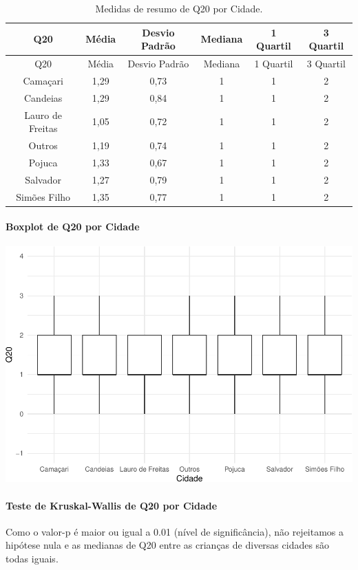 \documentclass[]{article}
\let\oldparagraph\paragraph
\renewcommand{\paragraph}[1]{\oldparagraph{#1}\mbox{}}
\begin{document}
\begin{longtable}[]{@{}cccccc@{}}
\caption{\label{tab:unnamed-chunk-371}Medidas de resumo de Q20 por Cidade.}\tabularnewline
\toprule
Q20 & Média & Desvio Padrão & Mediana & 1 Quartil & 3 Quartil\tabularnewline
\midrule
\endfirsthead
\toprule
Q20 & Média & Desvio Padrão & Mediana & 1 Quartil & 3 Quartil\tabularnewline
\midrule
\endhead
Camaçari & 1,29 & 0,73 & 1 & 1 & 2\tabularnewline
Candeias & 1,29 & 0,84 & 1 & 1 & 2\tabularnewline
Lauro de Freitas & 1,05 & 0,72 & 1 & 1 & 2\tabularnewline
Outros & 1,19 & 0,74 & 1 & 1 & 2\tabularnewline
Pojuca & 1,33 & 0,67 & 1 & 1 & 2\tabularnewline
Salvador & 1,27 & 0,79 & 1 & 1 & 2\tabularnewline
Simões Filho & 1,35 & 0,77 & 1 & 1 & 2\tabularnewline
\bottomrule
\end{longtable}

\hypertarget{boxplot-de-q20-por-cidade}{%
\paragraph{Boxplot de Q20 por Cidade}\label{boxplot-de-q20-por-cidade}}

\begin{center}\includegraphics[width=0.75\linewidth]{relatorio_covid19_files/figure-latex/unnamed-chunk-372-1} \end{center}

\hypertarget{teste-de-kruskal-wallis-de-q20-por-cidade}{%
\paragraph{Teste de Kruskal-Wallis de Q20 por Cidade}\label{teste-de-kruskal-wallis-de-q20-por-cidade}}

Como o valor-p é maior ou igual a 0.01 (nível de significância), não rejeitamos a hipótese nula e as medianas de Q20 entre as crianças de diversas cidades são todas iguais.
\end{document}
